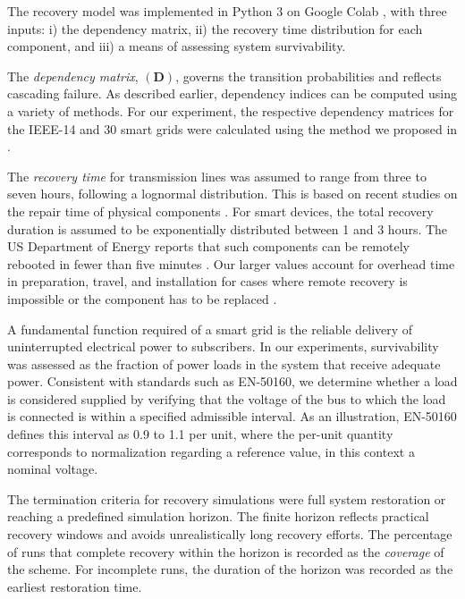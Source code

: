\documentclass[conference]{IEEEtran}
\begin{document}
The recovery model was implemented in Python 3 on Google Colab \cite{colab}, with three inputs: i) the dependency matrix, ii) the recovery time distribution for each component, and iii) a means of assessing system survivability. 

The \emph{dependency matrix}, $(\mathbf{D})$, governs the transition probabilities and reflects cascading failure. As described earlier, dependency indices can be computed using a variety of methods. For our experiment, the respective dependency matrices for the IEEE-14 and 30 smart grids were calculated using the method we proposed in \cite{marashi_identification_2021}. %

The \emph{recovery time} for transmission lines was assumed to range from three to seven hours, following a lognormal distribution. This is based on recent studies on the repair time of physical components \cite{zapata_repair_2008, arif_optimizing_2018}. For smart devices, the total recovery duration is assumed to be exponentially distributed between 1 and 3 hours. The US Department of Energy reports that such components can be remotely rebooted in fewer than five minutes \cite{noauthor_recovery_nodate}. Our larger values account for overhead time in preparation, travel, and installation for cases where remote recovery is impossible or the component has to be replaced \cite{arif_optimizing_2018}.

A fundamental function required of a smart grid is the reliable delivery of uninterrupted electrical power to subscribers. In our experiments, survivability was assessed as the fraction of power loads in the system that receive adequate power. Consistent with standards such as EN-50160, we determine whether a load is considered supplied by verifying that the voltage of the bus to which the load is connected is within a specified admissible interval. As an illustration, EN-50160 defines this interval as 0.9 to 1.1 per unit, where the per-unit quantity corresponds to normalization regarding a reference value, in this context a nominal voltage.

The termination criteria for recovery simulations were full system restoration or reaching a predefined simulation horizon. The finite horizon reflects practical recovery windows and avoids unrealistically long recovery efforts. The percentage of runs that complete recovery within the horizon is recorded as the \emph{coverage} of the scheme. For incomplete runs, the duration of the horizon was recorded as the earliest restoration time.
\end{document}
